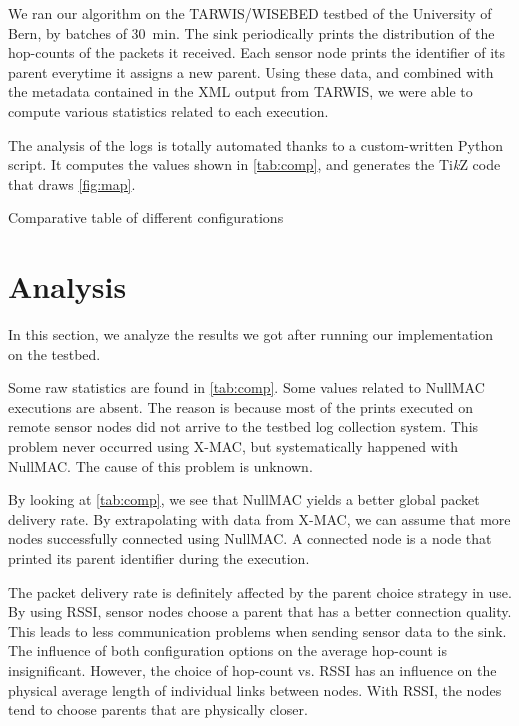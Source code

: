 \documentclass[a4paper]{llncs}
\begin{document}
We ran our algorithm on the TARWIS/WISEBED testbed of the University of Bern, by batches of \SI{30}{\minute}.
The sink periodically prints the distribution of the hop-counts of the packets it received.
Each sensor node prints the identifier of its parent everytime it assigns a new parent.
Using these data, and combined with the metadata contained in the XML output from TARWIS, we were able to compute various statistics related to each execution.

The analysis of the logs is totally automated thanks to a custom-written Python script.
It computes the values shown in \autoref{tab:comp}, and generates the Ti\textit{k}Z code that draws \autoref{fig:map}.

\begin{table}[tb]
\caption{Comparative table of different configurations}
\centering

\label{tab:comp}
\end{table}

\section{Analysis}

In this section, we analyze the results we got after running our implementation on the testbed.

Some raw statistics are found in \autoref{tab:comp}.
Some values related to NullMAC executions are absent.
The reason is because most of the prints executed on remote sensor nodes did not arrive to the testbed log collection system.
This problem never occurred using X-MAC, but systematically happened with NullMAC.
The cause of this problem is unknown.

By looking at \autoref{tab:comp}, we see that NullMAC yields a better global packet delivery rate.
By extrapolating with data from X-MAC, we can assume that more nodes successfully connected using NullMAC.
A connected node is a node that printed its parent identifier during the execution.

The packet delivery rate is definitely affected by the parent choice strategy in use.
By using RSSI, sensor nodes choose a parent that has a better connection quality.
This leads to less communication problems when sending sensor data to the sink.
The influence of both configuration options on the average hop-count is insignificant.
However, the choice of hop-count vs. RSSI has an influence on the physical average length of individual links between nodes.
With RSSI, the nodes tend to choose parents that are physically closer.
\end{document}
